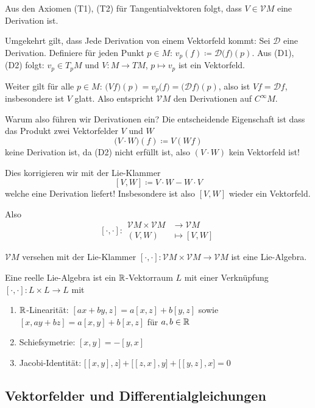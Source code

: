 \documentclass[a4paper,twoside,DIV15,BCOR12mm]{scrbook}
\renewcommand{\da}{\coloneqq}
\newcommand{\VM}{\mathcal V M}
\begin{document}
Aus den Axiomen (T1), (T2) für Tangentialvektoren folgt, dass $V\in\VM $ eine Derivation ist.

Umgekehrt gilt, dass Jede Derivation von einem Vektorfeld kommt:  Sei $\mathcal D$ eine Derivation. Definiere für jeden Punkt $p\in M$: $v_p(f) \da \mathcal D\big(f\big)(p)$. Aus (D1), (D2) folgt: $v_p\in T_pM$ und $V: M \to TM$, $p\mapsto v_p$ ist ein Vektorfeld.

Weiter gilt für alle $p\in M$: $\big(Vf\big)(p) = v_p\big(f\big) = \big(\mathcal D f\big) (p)$, also ist $Vf = \mathcal D f$, insbesondere ist $V$ glatt. Also entspricht $\VM $ den Derivationen auf $C^\infty M$.

Warum also führen wir Derivationen ein? Die entscheidende Eigenschaft ist dass das Produkt zwei Vektorfelder $V$ und $W$
\[
\big(V \cdot W\big) (f) \da V (W f)
\]
keine Derivation ist, da (D2) nicht erfüllt ist, also $(V\cdot W)$ kein Vektorfeld ist!

Dies korrigieren wir mit der Lie-Klammer
\[
[V,W] \da V\cdot W  - W\cdot V
\]
welche eine Derivation liefert! Insbesondere ist also $[V,W]$ wieder ein Vektorfeld.

Also 
\[[\cdot,\cdot]:
\begin{aligned}
\VM  \times \VM  &\to \VM  \\
(V,W) &\mapsto [V,W]
\end{aligned}
\]

\begin{lemma}
$\VM $ versehen mit der Lie-Klammer $[\cdot,\cdot]:\VM  \times \VM  \to \VM $ ist eine Lie-Algebra.
\label{lem5}
\end{lemma}

\begin{definition}
Eine reelle Lie-Algebra ist ein $\mathbb{R}$-Vektorraum $L$ mit einer Verknüpfung $[\cdot,\cdot]: L\times L \to L$ mit 
\begin{enumerate}[(L1)]
\item $\mathbb{R}$-Linearität: $[ax+by, z] = a [x,z] + b[y,z]$ sowie
$[x,ay + bz] = a[x,y] + b[x,z]$ für $a,b\in\mathbb{R}$
\item Schiefsymetrie: $[x,y] = -[y,x]$
\item Jacobi-Identität: $\big[ [x,y], z\big] + \big[ [z,x], y\big] + \big[[y,z], x\big] = 0$
\end{enumerate}
\end{definition}

\subsection*{Vektorfelder und Differentialgleichungen}
\end{document}
